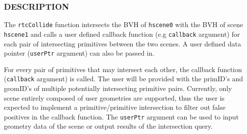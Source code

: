 \begin{Shaded}
\begin{Highlighting}[]

\OperatorTok{\{}
   \OperatorTok{,}\OperatorTok{;}
   \OperatorTok{,}\OperatorTok{;}
\OperatorTok{\};}

  \OperatorTok{(*}\OperatorTok{)} \OperatorTok{(}
  \OperatorTok{*}\OperatorTok{,}
\OperatorTok{*}\OperatorTok{,}
  \OperatorTok{);}

\OperatorTok{(}
\OperatorTok{,} 
\OperatorTok{,} 
\OperatorTok{,} 
    \OperatorTok{*}
\OperatorTok{);}
\end{Highlighting}
\end{Shaded}

\subsubsection{DESCRIPTION}\label{description}

The \texttt{rtcCollide} function intersects the BVH of \texttt{hscene0}
with the BVH of scene \texttt{hscene1} and calls a user defined callback
function (e.g \texttt{callback} argument) for each pair of intersecting
primitives between the two scenes. A user defined data pointer
(\texttt{userPtr} argument) can also be passed in.

For every pair of primitives that may intersect each other, the callback
function (\texttt{callback} argument) is called. The user will be
provided with the primID's and geomID's of multiple potentially
intersecting primitive pairs. Currently, only scene entirely composed of
user geometries are supported, thus the user is expected to implement a
primitive/primitive intersection to filter out false positives in the
callback function. The \texttt{userPtr} argument can be used to input
geometry data of the scene or output results of the intersection query.


